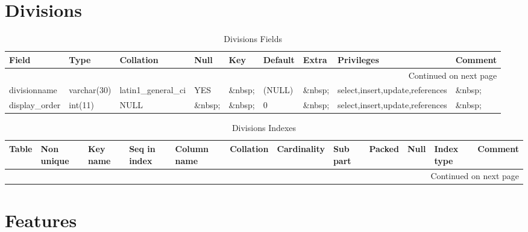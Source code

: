\documentclass[tablesignature,landscape]{scrartcl}
\begin{document}
\section{Divisions}
\label{sec-2}


\begin{longtable}{|l|l|l|l|l|l|l|l|l|}
\caption{Divisions Fields} \label{tbl:divisionsfields}\\
\hline
 Field             &  Type         &  Collation                &  Null     &  Key      &  Default  &  Extra              &  Privileges                       &  Comment \\
\hline
\endhead
\hline\multicolumn{9}{r}{Continued on next page}\
\endfoot
\endlastfoot
\hline
 divisionid        &  int(11)      &  NULL                     &  \&nbsp;  &  PRI      &  (NULL)   &  auto\_{}increment  &  select,insert,update,references  &  \&nbsp;  \\
 divisionname      &  varchar(30)  &  latin1\_{}general\_{}ci  &  YES      &  \&nbsp;  &  (NULL)   &  \&nbsp;            &  select,insert,update,references  &  \&nbsp;  \\
 display\_{}order  &  int(11)      &  NULL                     &  \&nbsp;  &  \&nbsp;  &  0        &  \&nbsp;            &  select,insert,update,references  &  \&nbsp;  \\
\hline
\end{longtable}


\begin{longtable}{|l|l|l|l|l|l|l|l|l|l|l|l|}
\caption{Divisions Indexes} \label{tbl:Divisionsindexes}\\
\hline
 Table      &  Non unique  &  Key name  &  Seq in index  &  Column name  &  Collation  &  Cardinality  &  Sub part  &  Packed  &  Null     &  Index type  &  Comment \\
\hline
\endhead
\hline\multicolumn{12}{r}{Continued on next page}\
\endfoot
\endlastfoot
\hline
 Divisions  &           0  &  PRIMARY   &             1  &  divisionid   &  A          &            5  &  (NULL)    &  (NULL)  &  \&nbsp;  &  BTREE       &  \&nbsp;  \\
\hline
\end{longtable}
\section{Features}
\label{sec-3}
\end{document}

